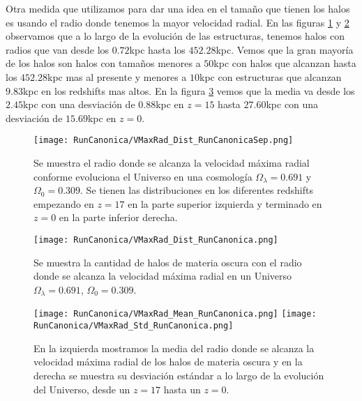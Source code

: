 Otra medida que utilizamos para dar una idea en el tamaño que tienen los halos es usando el radio donde tenemos la mayor velocidad radial. En las figuras \ref{fig:Canon-VMaxRadDistSep} y \ref{fig:Canon-VMaxRadDist} observamos que a lo largo de la evolución de las estructuras, tenemos halos con radios que van desde los $0.72$kpc hasta los $452.28$kpc. Vemos que la gran mayoría de los halos son halos con tamaños menores a $50$kpc con halos que alcanzan hasta los $452.28$kpc mas al presente y menores a $10$kpc con estructuras que alcanzan $9.83$kpc en los redshifts mas altos. En la figura \ref{fig:Canon-VMaxRadStats} vemos que la media va desde los $2.45$kpc con una desviación de $0.88$kpc en $z=15$ hasta $27.60$kpc con una desviación de $15.69$kpc en $z=0$.

\begin{figure}[H]
    \centering
    \texttt{[image: RunCanonica/VMaxRad\_Dist\_RunCanonicaSep.png]}
    \caption[Radio donde se alcanza la velocidad máxima radial]{\footnotesize Se muestra el radio donde se alcanza la velocidad máxima radial conforme evoluciona el Universo en una cosmología $\Omega_\lambda = 0.691 $ y $\Omega_0 = 0.309$. Se tienen las distribuciones en los diferentes redshifts empezando en $z=17$ en la parte superior izquierda y terminado en $z=0$ en la parte inferior derecha.}
    \label{fig:Canon-VMaxRadDistSep}
\end{figure}

\begin{figure}[H]
    \centering
    \texttt{[image: RunCanonica/VMaxRad\_Dist\_RunCanonica.png]}
    \caption[Distribución del radio donde se alcanza la velocidad máxima radial]{\footnotesize Se muestra la cantidad de halos de materia oscura con el radio donde se alcanza la velocidad máxima radial en un Universo $\Omega_\lambda = 0.691 $, $\Omega_0 = 0.309$.}
    \label{fig:Canon-VMaxRadDist}
\end{figure}

\begin{figure}[H]
    \centering
    \texttt{[image: RunCanonica/VMaxRad\_Mean\_RunCanonica.png]}
    \texttt{[image: RunCanonica/VMaxRad\_Std\_RunCanonica.png]}
    \caption[Media y desviación estándar del Radio donde se alcanza la velocidad máxima radial]{\footnotesize En la izquierda mostramos la media del radio donde se alcanza la velocidad máxima radial de los halos de materia oscura y en la derecha se muestra su desviación estándar a lo largo de la evolución del Universo, desde un $z=17$ hasta un $z=0$.}
    \label{fig:Canon-VMaxRadStats}
\end{figure}

